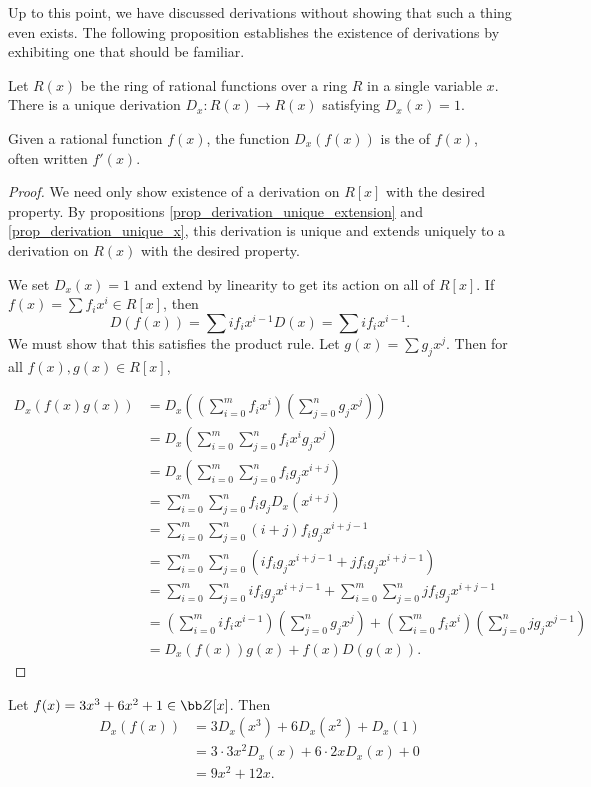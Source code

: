 Up to this point, we have discussed derivations without showing that such a thing even exists.
The following proposition establishes the existence of derivations by exhibiting one that should be familiar.

\begin{proposition}
  \label{prop_derivation_formal_derivative}
  Let $R(x)$ be the ring of rational functions over a ring $R$ in a single variable $x$.
  There is a unique derivation $D_x : R(x) \to R(x)$ satisfying $D_x(x) = 1$.
\end{proposition}
Given a rational function $f(x)$, the function $D_x(f(x))$ is the  of $f(x)$, often written $f'(x)$.
\begin{proof}
  We need only show existence of a derivation on $R[x]$ with the desired property.
  By propositions \ref{prop_derivation_unique_extension} and \ref{prop_derivation_unique_x},
  this derivation is unique and extends uniquely to a derivation on $R(x)$ with the desired property.
  
  We set $D_x(x) = 1$ and extend by linearity to get its action on all of $R[x]$.
  If $f(x) = \sum f_ix^i \in R[x]$, then
    \[ D(f(x)) = \sum if_ix^{i-1}D(x) = \sum if_ix^{i-1}. \]
  We must show that this satisfies the product rule.
  Let $g(x) = \sum g_jx^j$. Then for all $f(x), g(x) \in R[x]$,
  
  \begin{align*}
    D_x(f(x)g(x))
      &= D_x \left( \left( \sum_{i=0}^m f_ix^i \right) \left( \sum_{j=0}^n g_jx^j \right) \right) \\
      &= D_x \left( \sum_{i=0}^m \sum_{j=0}^n f_ix^i g_jx^j \right) \\
      &= D_x \left( \sum_{i=0}^m \sum_{j=0}^n f_ig_jx^{i+j} \right) \\
      &= \sum_{i=0}^m \sum_{j=0}^n f_ig_jD_x(x^{i+j}) \\
      &= \sum_{i=0}^m \sum_{j=0}^n (i+j)f_ig_jx^{i+j-1} \\
      &= \sum_{i=0}^m \sum_{j=0}^n (if_ig_jx^{i+j-1} + jf_ig_jx^{i+j-1}) \\
      &= \sum_{i=0}^m \sum_{j=0}^n if_ig_jx^{i+j-1} + \sum_{i=0}^m \sum_{j=0}^n jf_ig_jx^{i+j-1} \\
      &= \left( \sum_{i=0}^m if_ix^{i-1} \right) \left( \sum_{j=0}^n g_jx^j \right) + \left( \sum_{i=0}^m f_ix^i \right) \left( \sum_{j=0}^n jg_jx^{j-1} \right) \\
      &= D_x(f(x)) g(x) + f(x)D(g(x)).
  \end{align*}
\end{proof}
\begin{example}
  Let $f(x) = 3x^3 + 6x^2 + 1 \in \bb Z[x]$. Then
  \begin{align*}
    D_x(f(x))
      &= 3D_x(x^3) + 6D_x(x^2) + D_x(1) \\
      &= 3 \cdot 3 x^2 D_x(x) + 6 \cdot 2 x D_x(x) + 0 \\
      &= 9 x^2 + 12 x. \\
  \end{align*}
\end{example}

